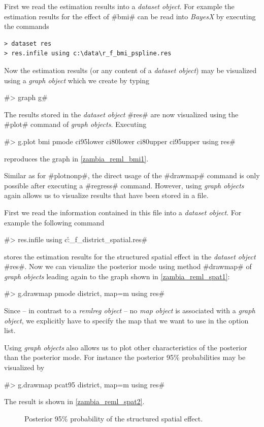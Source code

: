 First we read the estimation results into a {\it dataset object}.
For example the estimation results for the effect of #bmi# can be
read into {\it BayesX} by executing the commands

\begin{verbatim}
> dataset res
> res.infile using c:\data\r_f_bmi_pspline.res
\end{verbatim}

Now the estimation results (or any content of a {\it dataset
object}) may be visualized using a {\it graph object} which we
create by typing

#> graph g#

The results stored in the {\em dataset object} #res# are now
visualized using the #plot# command of {\it graph objects}.
Executing

 #> g.plot bmi pmode ci95lower ci80lower ci80upper ci95upper using res#

reproduces the graph in \autoref{zambia_reml_bmi1}.

Similar as for #plotnonp#, the direct usage of the #drawmap#
command is only possible after executing a #regress# command.
However, using {\it graph objects} again allows us to visualize
results that have been stored in a file.

First we read the information contained in this file into a {\it
dataset object}. For example the following command

#> res.infile using c:\data\r_f_district_spatial.res#

stores the estimation results for the structured spatial effect in
the {\em dataset object} #res#. Now we can visualize the posterior
mode using method #drawmap# of {\it graph objects} leading again
to the graph shown in \autoref{zambia_reml_spat1}:

#> g.drawmap pmode district, map=m using res#

Since -- in contrast to a {\it remlreg object} -- no {\it map
object} is associated with a {\it graph object}, we explicitly
have to specify the map that we want to use in the option list.

Using {\it graph objects} also allows us to plot other
characteristics of the posterior than the posterior mode. For
instance the posterior 95\% probabilities may be visualized by

#> g.drawmap pcat95 district, map=m using res#

The result is shown in \autoref{zambia_reml_spat2}.

\begin{figure}[ht]
\begin{center}
{\it\caption{Posterior 95\% probability of the structured spatial
effect.\label{zambia_reml_spat2}}}
\end{center}
\end{figure}

